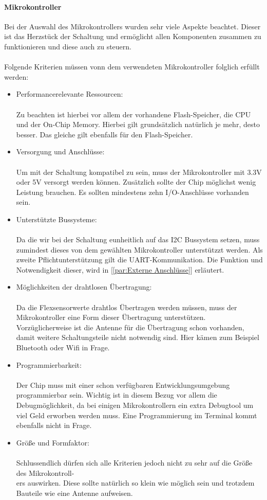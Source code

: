 \documentclass[titlepage,12pt,twoside]{article}
\begin{document}
\paragraph{Mikrokontroller}
\label{par:Mikrokontroller}
\hfill \break
\hfill \break
Bei der Auswahl des Mikrokontrollers wurden sehr viele Aspekte beachtet. Dieser ist das Herzstück der Schaltung und ermöglicht
allen Komponenten zusammen zu funktionieren und diese auch zu steuern. \\
\\
Folgende Kriterien müssen vonn dem verwendeten Mikrokontroller folglich erfüllt werden:
\begin{itemize}
	\item Performancerelevante Ressourcen: \\
		  \\
		  Zu beachten ist hierbei vor allem der vorhandene Flash-Speicher, die CPU und der On-Chip Memory. Hierbei gilt grundsätzlich 
		  natürlich je mehr, desto besser. Das gleiche gilt ebenfalls für den Flash-Speicher.
	\item Versorgung und Anschlüsse: \\
		  \\
		  Um mit der Schaltung kompatibel zu sein, muss der Mikrokontroller mit 3.3V oder 5V versorgt werden können. Zusätzlich
		  sollte der Chip möglichst wenig Leistung brauchen. Es sollten mindestens zehn I/O-Anschlüsse vorhanden sein.
	\item Unterstützte Bussysteme: \\
		  \\
		  Da die wir bei der Schaltung eunheitlich auf das I2C Bussystem setzen, muss zumindest dieses von dem gewählten Mikrokontroller
		  unterstützzt werden. Als zweite Pflichtunterstützung gilt die UART-Kommunikation. Die Funktion und Notwendigkeit dieser,
		  wird in [\textcolor{blue}{\autoref{par:Externe Anschlüsse}}] erläutert.
	\item Möglichkeiten der drahtlosen Übertragung: \\
		  \\
		  Da die Flexsensorwerte drahtlos Übertragen werden müssen, muss der Mikrokontroller eine Form dieser Übertragung unterstützen.
		  Vorzüglicherweise ist die Antenne für die Übertragung schon vorhanden, damit weitere Schaltungsteile nicht notwendig sind.
		  Hier kämen zum Beispiel Bluetooth oder Wifi in Frage.
	\item Programmierbarkeit: \\
		  \\
		  Der Chip muss mit einer schon verfügbaren Entwicklungsumgebung programmierbar sein. Wichtig ist in diesem Bezug vor allem
		  die Debugmöglichkeit, da bei einigen Mikrokontrollern ein extra Debugtool um viel Geld erworben werden muss. Eine Programmierung
		  im Terminal kommt ebenfalls nicht in Frage.
	\item Größe und Formfaktor: \\
		  \\
		  Schlussendlich dürfen sich alle Kriterien jedoch nicht zu sehr auf die Größe des Mikrokontroll-\\ers auswirken. Diese sollte
		  natürlich so klein wie möglich sein und trotzdem Bauteile wie eine Antenne aufweisen.
\end{itemize}
\end{document}
